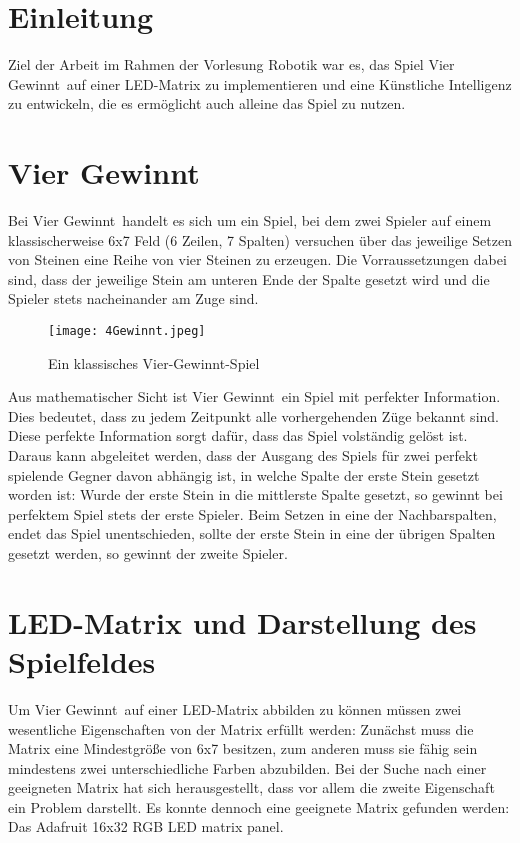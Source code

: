\section{Einleitung}

Ziel der Arbeit im Rahmen der Vorlesung Robotik war es, das Spiel \glqq Vier Gewinnt\grqq ~auf einer LED-Matrix zu implementieren und eine Künstliche Intelligenz zu entwickeln, die es ermöglicht auch alleine das Spiel zu nutzen.

\section{Vier Gewinnt}
\label{sec:vierg}
Bei \glqq Vier Gewinnt\grqq ~handelt es sich um ein Spiel, bei dem zwei Spieler auf einem klassischerweise 6x7 Feld (6 Zeilen, 7 Spalten) versuchen über das jeweilige Setzen von Steinen eine Reihe von vier Steinen zu erzeugen. Die Vorraussetzungen dabei sind, dass der jeweilige Stein am unteren Ende der Spalte gesetzt wird und die Spieler stets nacheinander am Zuge sind.

\begin{figure}[!hbt]
	\centering
	\texttt{[image: 4Gewinnt.jpeg]}
	\caption{Ein klassisches Vier-Gewinnt-Spiel}
\end{figure}

Aus mathematischer Sicht ist \glqq Vier Gewinnt\grqq ~ein Spiel mit perfekter Information. Dies bedeutet, dass zu jedem Zeitpunkt alle vorhergehenden Züge bekannt sind. Diese perfekte Information sorgt dafür, dass das Spiel volständig gelöst ist. Daraus kann abgeleitet werden, dass der Ausgang des Spiels für zwei perfekt spielende Gegner davon abhängig ist, in welche Spalte der erste Stein gesetzt worden ist: Wurde der erste Stein in die mittlerste Spalte gesetzt, so gewinnt bei perfektem Spiel stets der erste Spieler. Beim Setzen in eine der Nachbarspalten, endet das Spiel unentschieden, sollte der erste Stein in eine der übrigen Spalten gesetzt werden, so gewinnt der zweite Spieler. 

\section{LED-Matrix und Darstellung des Spielfeldes}
Um \glqq Vier Gewinnt\grqq ~auf einer LED-Matrix abbilden zu können müssen zwei wesentliche Eigenschaften von der Matrix erfüllt werden: Zunächst muss die Matrix eine Mindestgröße von 6x7 besitzen, zum anderen muss sie fähig sein mindestens zwei unterschiedliche Farben abzubilden.
Bei der Suche nach einer geeigneten Matrix hat sich herausgestellt, dass vor allem die zweite Eigenschaft ein Problem darstellt.
Es konnte dennoch eine geeignete Matrix gefunden werden:
Das \glqq Adafruit 16x32 RGB LED matrix panel\grqq.

